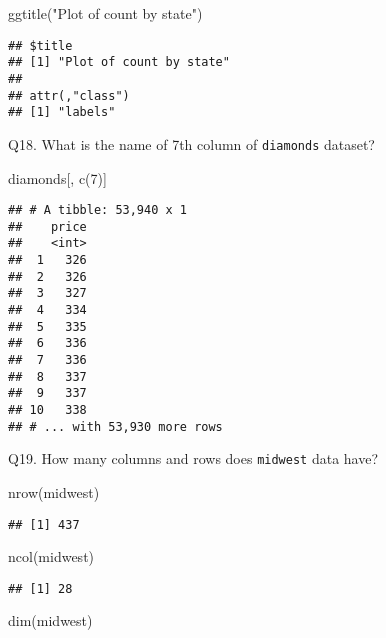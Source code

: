 \documentclass[
]{article}
\newenvironment{Shaded}{\begin{snugshade}}{\end{snugshade}}
\newcommand{\DecValTok}[1]{\textcolor[rgb]{0.00,0.00,0.81}{#1}}
\newcommand{\FunctionTok}[1]{\textcolor[rgb]{0.00,0.00,0.00}{#1}}
\newcommand{\NormalTok}[1]{#1}
\newcommand{\StringTok}[1]{\textcolor[rgb]{0.31,0.60,0.02}{#1}}
\begin{document}
\begin{Shaded}
\begin{Highlighting}[]
  \FunctionTok{ggtitle}\NormalTok{(}\StringTok{"Plot of count by state"}\NormalTok{)}
\end{Highlighting}
\end{Shaded}

\begin{verbatim}
## $title
## [1] "Plot of count by state"
## 
## attr(,"class")
## [1] "labels"
\end{verbatim}

Q18. What is the name of 7th column of \texttt{diamonds} dataset?

\begin{Shaded}
\begin{Highlighting}[]
\NormalTok{diamonds[, }\FunctionTok{c}\NormalTok{(}\DecValTok{7}\NormalTok{)]}
\end{Highlighting}
\end{Shaded}

\begin{verbatim}
## # A tibble: 53,940 x 1
##    price
##    <int>
##  1   326
##  2   326
##  3   327
##  4   334
##  5   335
##  6   336
##  7   336
##  8   337
##  9   337
## 10   338
## # ... with 53,930 more rows
\end{verbatim}

Q19. How many columns and rows does \texttt{midwest} data have?

\begin{Shaded}
\begin{Highlighting}[]
\FunctionTok{nrow}\NormalTok{(midwest)}
\end{Highlighting}
\end{Shaded}

\begin{verbatim}
## [1] 437
\end{verbatim}

\begin{Shaded}
\begin{Highlighting}[]
\FunctionTok{ncol}\NormalTok{(midwest)}
\end{Highlighting}
\end{Shaded}

\begin{verbatim}
## [1] 28
\end{verbatim}

\begin{Shaded}
\begin{Highlighting}[]
\FunctionTok{dim}\NormalTok{(midwest)}
\end{Highlighting}
\end{Shaded}
\end{document}
